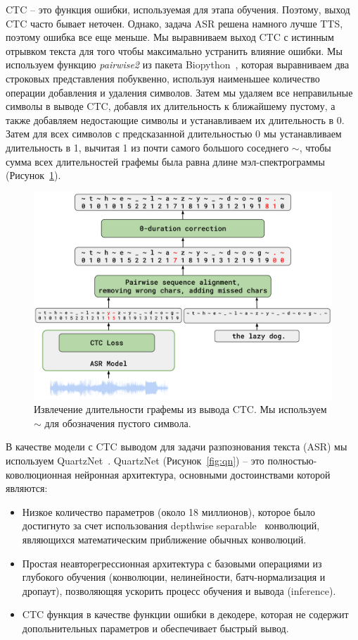 CTC -- это функция ошибки, используемая для этапа обучения. Поэтому, выход CTC часто бывает неточен. Однако, задача ASR решена намного лучше TTS, поэтому ошибка все еще меньше. Мы выравниваем выход CTC с истинным отрывком текста для того чтобы максимально устранить влияние ошибки. Мы используем функцию \textit{pairwise2} из пакета Biopython~\cite{biopython}, которая выравниваем два строковых представления побуквенно, используя наименьшее количество операции добавления и удаления символов. Затем мы удаляем все неправильные символы в выводе CTC, добавля их длительность к ближайшему пустому, а также добавляем недостающие символы и устанавливаем их длительность в $0$. Затем для всех символов с предсказанной длительностью 0 мы устанавливаем длительность в 1, вычитая 1 из почти самого большого соседнего $\sim$, чтобы сумма всех длительностей графемы была равна длине мэл-спектрограммы (Рисунок~\ref{fig:alignment}).

\begin{figure}[!ht]
\centering
\includegraphics[width=1.0\textwidth]{images/alignment.png}
\caption{Извлечение длительности графемы из вывода CTC. Мы используем $\sim$ для обозначения пустого символа.}
\label{fig:alignment}
\end{figure}

В качестве модели с CTC выводом для задачи разпознования текста (ASR) мы используем QuartzNet~\cite{quartznet}. QuartzNet (Рисунок~\ref{fig:qn}) -- это полностью-коволюционная нейронная архитектура, основными достоинствами которой являются:
\begin{itemize}
    \item Низкое количество параметров (около 18 миллионов), которое было достигнуто за счет использования depthwise separable~\cite{kaiser2017depthwise} конволюций, являющихся математическим приближение обычных конволюций.
    \item Простая неавторегрессионная архитектура с базовыми операциями из глубокого обучения (конволюции, нелинейности, батч-нормализация и дропаут), позволяющяя ускорить процесс обучения и вывода (inference).
    \item CTC функция в качестве функции ошибки в декодере, которая не содержит допольнительных параметров и обеспечивает быстрый вывод.
\end{itemize}

